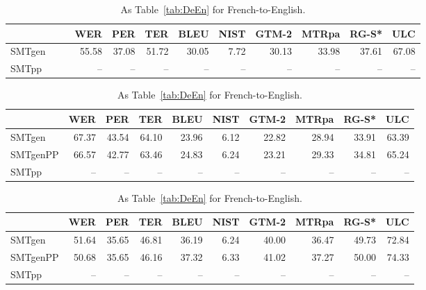 \documentclass[a4paper,11pt]{article}
\begin{document}
\begin{table}[t]
\small
{}
\begin{tabular}{lrrrrrrrrr}
\toprule
         & WER   &  PER  & TER   &  BLEU & NIST & GTM-2 & MTRpa & RG-S* & ULC \\
\midrule
SMTgen~~~~& 55.58 & 37.08 & 51.72 & 30.05 & 7.72 & 30.13 & 33.98 & 37.61 & 67.08 \\  
SMTpp    &   --  &   --  &   --  &   --  &  --  &   --  &   --  &   --  &   --  \\
\bottomrule
\end{tabular}

\begin{tabular}{lrrrrrrrrr}
\toprule
         & WER   &  PER  & TER   &  BLEU & NIST & GTM-2 & MTRpa & RG-S* & ULC \\
\midrule
SMTgen	 & 67.37 & 43.54 & 64.10 & 23.96 & 6.12 & 22.82 & 28.94 & 33.91 & 63.39 \\  
SMTgenPP & 66.57 & 42.77 & 63.46 & 24.83 & 6.24 & 23.21 & 29.33 & 34.81 & 65.24 \\  
SMTpp    &   --  &   --  &   --  &   --  &  --  &   --  &   --  &   --  &   --  \\
\bottomrule
\end{tabular}

\begin{tabular}{lrrrrrrrrr}
\toprule
         & WER   &  PER  & TER   &  BLEU & NIST & GTM-2 & MTRpa & RG-S* & ULC \\
\midrule
SMTgen	 & 51.64 & 35.65 & 46.81 & 36.19 & 6.24 & 40.00 & 36.47 & 49.73 & 72.84 \\  
SMTgenPP & 50.68 & 35.65 & 46.16 & 37.32 & 6.33 & 41.02 & 37.27 & 50.00 & 74.33 \\  
SMTpp    &   --  &   --  &   --  &   --  &  --  &   --  &   --  &   --  &   --  \\
\bottomrule
\end{tabular}
 \caption{As Table~\ref{tab:DeEn} for French-to-English.}
 \label{tab:FrEn}
\end{table}
\end{document}
